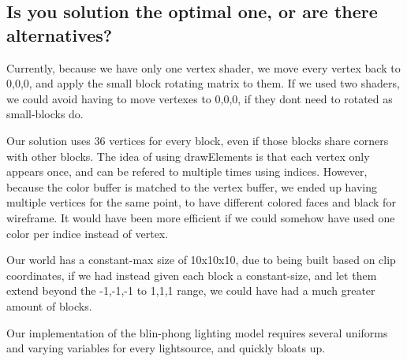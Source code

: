\subsection{Is you solution the optimal one, or are there alternatives?}

Currently, because we have only one vertex shader, we move every vertex back to 0,0,0, and apply the small block rotating matrix to them.
If we used two shaders, we could avoid having to move vertexes to 0,0,0, if they dont need to rotated as small-blocks do.

Our solution uses 36 vertices for every block, even if those blocks share corners with other blocks.
The idea of using drawElements is that each vertex only appears once, 
and can be refered to multiple times using indices.
However, because the color buffer is matched to the vertex buffer, 
we ended up having multiple vertices for the same point, 
to have different colored faces and black for wireframe.
It would have been more efficient if we could somehow have used one color per indice instead of vertex.

Our world has a constant-max size of 10x10x10, due to being built based on clip coordinates, 
if we had instead given each block a constant-size, and let them extend beyond the -1,-1,-1 to 1,1,1 range, 
we could have had a much greater amount of blocks.

Our implementation of the blin-phong lighting model requires several uniforms and varying variables for every lightsource, and quickly bloats up.